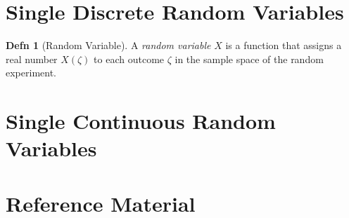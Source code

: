 \documentclass[10pt,letterpaper,final,twoside,notitlepage]{article}
\theoremstyle{plain}
\theoremstyle{definition}
\newtheorem{definition}{Defn}
\theoremstyle{remark}
\begin{document}
\section{Single Discrete Random Variables} \label{sec:Single Discrete Random Variables}
	\begin{definition}[Random Variable]
		A \emph{random variable} $X$ is a function that assigns a real number $X \left( \zeta \right)$ to each outcome $\zeta$ in the sample space of the random experiment.
	\end{definition}
\section{Single Continuous Random Variables} \label{sec:Single Continuous Random Variables}





\clearpage
\appendix
{}

\section{Reference Material} \label{sec:Reference Material}


\end{document}
